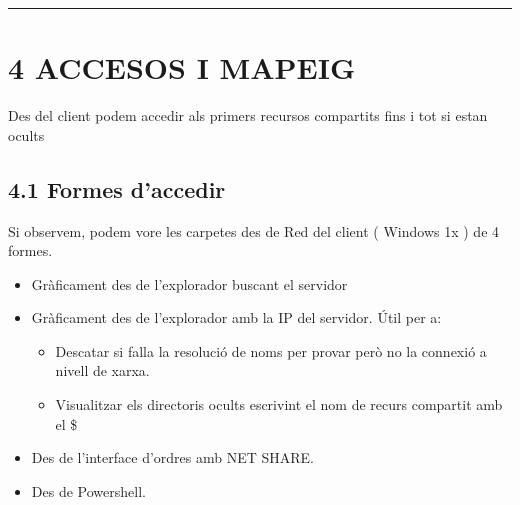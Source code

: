\documentclass[
  a4paper,
]{article}
\begin{document}
\begin{center}\rule{0.5\linewidth}{0.5pt}\end{center}

\section{4 ACCESOS I MAPEIG}\label{accesos-i-mapeig}

Des del client podem accedir als primers recursos compartits fins i tot
si estan ocults

\subsection{4.1 Formes d'accedir}\label{formes-daccedir}

Si observem, podem vore les carpetes des de Red del client ( Windows 1x
) de 4 formes.

\begin{itemize}
\item
  Gràficament des de l'explorador buscant el servidor
\item
  Gràficament des de l'explorador amb la IP del servidor. Útil per a:

  \begin{itemize}
  \item
    Descatar si falla la resolució de noms per provar però no la
    connexió a nivell de xarxa.
  \item
    Visualitzar els directoris ocults escrivint el nom de recurs
    compartit amb el \$
  \end{itemize}
\item
  Des de l'interface d'ordres amb NET SHARE.
\item
  Des de Powershell.
\end{itemize}
\end{document}
